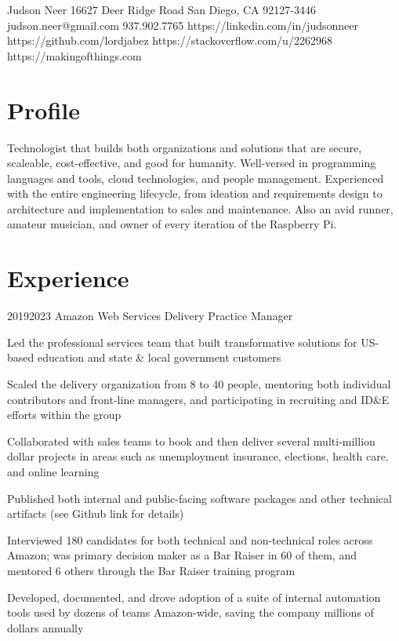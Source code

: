 \documentclass{article}
\begin{document}
\header
  {Judson Neer}
  {16627 Deer Ridge Road}
  {San Diego, CA 92127-3446}
  {judson.neer@gmail.com}
  {937.902.7765}
  {https://linkedin.com/in/judsonneer}
  {https://github.com/lordjabez}
  {https://stackoverflow.com/u/2262968}
  {https://makingofthings.com}


\section{Profile}

Technologist that builds both organizations and solutions that are secure, scaleable, cost-effective, and good for humanity. Well-versed in programming languages and tools, cloud technologies, and people management. Experienced with the entire engineering lifecycle, from ideation and requirements design to architecture and implementation to sales and maintenance. Also an avid runner, amateur musician, and owner of every iteration of the Raspberry Pi.


\section{Experience}

\job
  {2019}{2023}
  {Amazon Web Services}
  {Delivery Practice Manager}
  {\begin{achievements}
    \item Led the professional services team that built transformative solutions for US-based education and state \& local government customers
    \item Scaled the delivery organization from 8 to 40 people, mentoring both individual contributors and front-line managers, and participating in recruiting and ID\&E efforts within the group
    \item Collaborated with sales teams to book and then deliver several multi-million dollar projects in areas such as unemployment insurance, elections, health care, and online learning
    \item Published both internal and public-facing software packages and other technical artifacts (see Github link for details)
    \item Interviewed 180 candidates for both technical and non-technical roles across Amazon; was primary decision maker as a Bar Raiser in 60 of them, and mentored 6 others through the Bar Raiser training program
    \item Developed, documented, and drove adoption of a suite of internal automation tools used by dozens of teams Amazon-wide, saving the company millions of dollars annually
  \end{achievements}}
\end{document}
